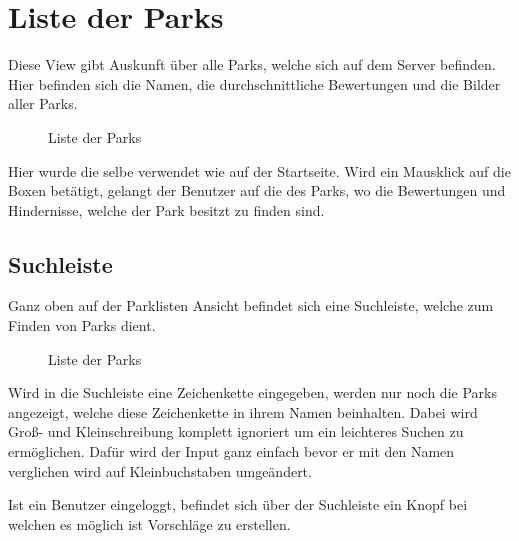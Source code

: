 \section{Liste der Parks}
\label{parklist}

Diese View gibt Auskunft über alle Parks, welche sich auf dem Server befinden. Hier befinden sich die 
Namen, die durchschnittliche Bewertungen und die Bilder aller Parks. 

\begin{figure}[H]
    \begin{center}
      \caption{Liste der Parks}
    \end{center}
\end{figure}

Hier wurde die selbe \underline{} verwendet wie auf der Startseite. Wird ein Mausklick auf die 
Boxen betätigt, gelangt der Benutzer auf die \underline{} des Parks, wo die Bewertungen und Hindernisse,
welche der Park besitzt zu finden sind. 

\subsection{Suchleiste}

Ganz oben auf der Parklisten Ansicht befindet sich eine Suchleiste, welche zum Finden von Parks dient.

\begin{figure}[H]
    \begin{center}
      \caption{Liste der Parks}
    \end{center}
\end{figure}

Wird in die Suchleiste eine Zeichenkette eingegeben, werden nur noch die Parks angezeigt, welche diese 
Zeichenkette in ihrem Namen beinhalten. Dabei wird Groß- und Kleinschreibung komplett ignoriert um ein 
leichteres Suchen zu ermöglichen. Dafür wird der Input ganz einfach bevor er mit den Namen verglichen wird 
auf Kleinbuchstaben umgeändert.


Ist ein Benutzer eingeloggt, befindet sich über der Suchleiste ein Knopf bei welchen es möglich ist Vorschläge
zu erstellen.